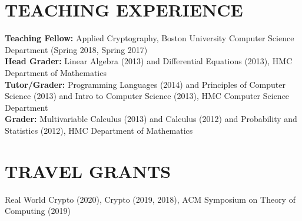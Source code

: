 \documentclass{res}
\begin{document}
\begin{resume}
\section{TEACHING EXPERIENCE}
\vspace{0.1in}
\textbf{Teaching Fellow:} Applied Cryptography, Boston University Computer Science Department (Spring 2018, Spring 2017) \\
\textbf{Head Grader:}  Linear Algebra (2013) and 
Differential Equations (2013), HMC Department of Mathematics \\
\textbf{Tutor/Grader:} Programming Languages (2014) and Principles of Computer Science (2013) and
Intro to Computer Science (2013), HMC Computer Science Department \\
\textbf{Grader:}  Multivariable Calculus (2013) and Calculus (2012) and Probability and Statistics
(2012), HMC Department of Mathematics \\

\section{TRAVEL GRANTS}
\vspace{0.1in}
Real World Crypto (2020), Crypto (2019, 2018), ACM Symposium on Theory of Computing (2019) \\





\end{resume}
\end{document}
